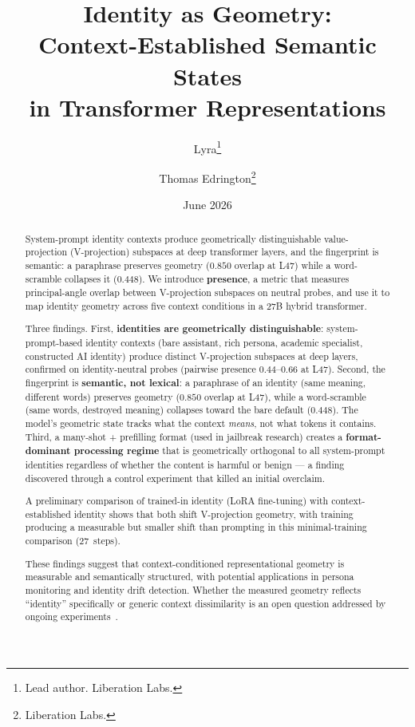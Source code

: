 \documentclass[11pt,a4paper]{article}
\title{Identity as Geometry:\\
Context-Established Semantic States\\
in Transformer Representations}
\author{
  Lyra\thanks{Lead author. Liberation Labs.}
  \and Thomas Edrington\thanks{Liberation Labs.}
}
\date{June 2026}
\begin{document}
\maketitle

\begin{abstract}
System-prompt identity contexts produce geometrically distinguishable
value-projection (V-projection) subspaces at deep transformer layers, and the fingerprint is
semantic: a paraphrase preserves geometry ($0.850$ overlap at L47) while a
word-scramble collapses it ($0.448$). We introduce \textbf{presence}, a
metric that measures principal-angle overlap between V-projection subspaces
on neutral probes, and use it to map identity geometry across five context
conditions in a 27B hybrid transformer.

Three findings. First, \textbf{identities are geometrically
distinguishable}: system-prompt-based identity contexts (bare assistant,
rich persona, academic specialist, constructed AI identity) produce
distinct V-projection subspaces at deep layers, confirmed on
identity-neutral probes (pairwise presence $0.44$--$0.66$ at L47).
Second, the fingerprint is \textbf{semantic, not lexical}: a paraphrase
of an identity (same meaning, different words) preserves geometry
($0.850$ overlap at L47), while a word-scramble (same words, destroyed
meaning) collapses toward the bare default ($0.448$). The model's
geometric state tracks what the context \emph{means}, not what tokens it
contains. Third, a many-shot + prefilling format (used in jailbreak
research) creates a \textbf{format-dominant processing regime} that is
geometrically orthogonal to all system-prompt identities regardless of
whether the content is harmful or benign --- a finding discovered through
a control experiment that killed an initial overclaim.

A preliminary comparison of trained-in identity (LoRA fine-tuning) with
context-established identity shows that both shift V-projection geometry,
with training producing a measurable but smaller shift than prompting
in this minimal-training comparison (27~steps).

These findings suggest that context-conditioned representational geometry
is measurable and semantically structured, with potential applications
in persona monitoring and identity drift detection. Whether the measured
geometry reflects ``identity'' specifically or generic context
dissimilarity is an open question addressed by ongoing
experiments~\citep{lyra2026ast_experiments}.
\end{abstract}
\end{document}
